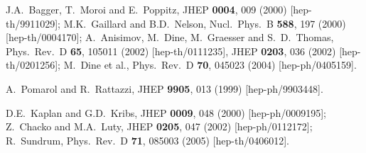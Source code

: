\documentclass[11pt]{article}
\begin{document}
\begin{thebibliography}{999}
J.A.~Bagger, T.~Moroi and E.~Poppitz,
  JHEP {\bf 0004}, 009 (2000)
  [hep-th/9911029];
M.K.~Gaillard and B.D.~Nelson,
  Nucl.\ Phys.\ B {\bf 588}, 197 (2000)
  [hep-th/0004170];
A.~Anisimov, M.~Dine, M.~Graesser and S.~D.~Thomas,
  Phys.\ Rev.\ D {\bf 65}, 105011 (2002)
  [hep-th/0111235],
  JHEP {\bf 0203}, 036 (2002)
  [hep-th/0201256];
M.~Dine et al.,
  Phys.\ Rev.\ D {\bf 70}, 045023 (2004)
  [hep-ph/0405159].

A.~Pomarol and R.~Rattazzi,
  JHEP {\bf 9905}, 013 (1999)
  [hep-ph/9903448].

D.E.~Kaplan and G.D.~Kribs,
  JHEP {\bf 0009}, 048 (2000)
  [hep-ph/0009195];
Z.~Chacko and M.A.~Luty,
  JHEP {\bf 0205}, 047 (2002)
  [hep-ph/0112172];
R.~Sundrum,
  Phys.\ Rev.\ D {\bf 71}, 085003 (2005)
  [hep-th/0406012].


\end{thebibliography}
\end{document}
